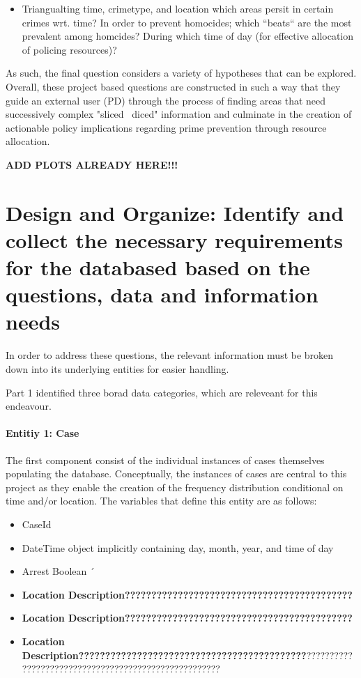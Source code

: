 \documentclass[a4paper]{article}
\begin{document}
\begin{itemize}
  \item Triangualting time, crimetype, and location which areas persit in certain crimes wrt. time?
In order to prevent homocides; which “beats“ are the most prevalent among homcides? During which time of day (for effective allocation of policing resources)? 

\end{itemize}

As such, the final question considers a variety of hypotheses that can be explored. Overall, these project based questions are constructed in such a way that they guide an external user (PD) through the process of finding areas that need successively complex "sliced \ diced" information and culminate in the creation of actionable policy implications regarding prime prevention through resource allocation.


\textbf{ADD PLOTS ALREADY HERE!!!}


\section{Design and Organize: Identify and collect the necessary requirements for the databased based on the questions, data and information needs}
In order to address these questions, the relevant information must be broken down into its underlying entities for easier handling. 

Part 1 identified three borad data categories, which are releveant for this endeavour. 
\paragraph{Entitiy 1: Case} The first component consist of the individual instances of cases themselves populating the database. Conceptually, the instances of cases are central to this project as they enable the creation of the frequency distribution conditional on time and/or location. The variables that define this entity are as follows:

\begin{itemize}
  \item CaseId
  \item DateTime object implicitly containing day, month, year, and time of day 
  \item Arrest Boolean  
´  \item \textbf{Location Description???????????????????????????????????????????}
\item \textbf{Location Description???????????????????????????????????????????}
\item \textbf{Location Description???????????????????????????????????????????}?????????????????????????????????????????????????????
\end{itemize}
 
\end{document}
